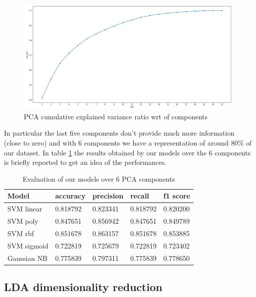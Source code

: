\documentclass[a4paper,12pt]{article}
\begin{document}
\begin{figure}[H]
  \begin{center}
  \includegraphics[width=1.0\textwidth]{images/pca.png}
  \end{center}
  \caption{PCA cumulative explained variance ratio wrt of components}
  \label{fig:pca}
\end{figure}

\noindent In particular the last five components don't provide much more information (close to zero) and with 6 components we have a representation of around 80\% of our dataset. In table \ref{tab:pca} the results obtained by our models over the 6 components is briefly reported to get an idea of the performances.

\begin{table}[H]
  \begin{tabular}{ |p{6cm}||p{2cm}|p{2cm}|p{2cm}|p{2cm}| }
    \hline
    Model& accuracy & precision  &  recall & f1 score \\
    \hline
    SVM linear           &0.818792&   0.823341&  0.818792&  0.820200\\
    SVM poly             &0.847651&   0.856942&  0.847651&  0.849789\\
    SVM rbf              &0.851678&   0.863157&  0.851678&  0.853885\\
    SVM sigmoid          &0.722819&   0.725679&  0.722819&  0.723402\\
    Gaussian NB          &0.775839&   0.797311&  0.775839&  0.778650\\
    \hline
  \end{tabular}
  \caption{Evaluation of our models over 6 PCA components}
  \label{tab:pca}
  \end{table}

\newpage
\subsection{LDA dimensionality reduction}
\end{document}

